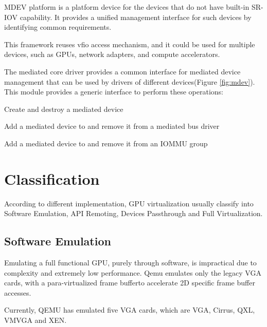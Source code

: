 \documentclass[a4paper,12pt]{article}
\begin{document}
MDEV platform is a platform device for the devices that do not have built-in SR-IOV capability.
It provides a unified management interface for such devices by identifying common requirements. 

This framework reuses vfio access mechanism, and it could be used for multiple devices, such as GPUs, network adapters, and compute accelerators. 

The mediated core driver provides a common interface for mediated device management that can be used by drivers of different devices(Figure \ref{fig:mdev}). This module provides a generic interface to perform these operations:

Create and destroy a mediated device

Add a mediated device to and remove it from a mediated bus driver

Add a mediated device to and remove it from an IOMMU group

\section{Classification}
According to different implementation, GPU virtualization usually classify into Software Emulation, API Remoting, Devices Passthrough and Full Virtualization.  

\subsection{Software Emulation}
Emulating a full functional GPU, purely through software, is impractical due to complexity and extremely low performance. Qemu emulates only the legacy VGA cards, with a para-virtualized frame bufferto accelerate 2D specific frame buffer accesses.

Currently, QEMU has emulated five VGA cards, which are VGA, Cirrus, QXL, VMVGA and XEN.
\end{document}

